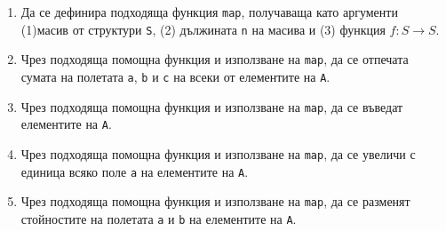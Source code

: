 \documentclass[12pt,a4paper]{article}
\begin{document}
\begin{enumerate}
\begin{enumerate}
	\item Да се дефинира подходяща функция \texttt{map}, получаваща като аргументи (1)масив от структури \texttt{S}, (2) дължината \texttt{n} на масива и (3) функция $f:S \rightarrow S$. 
	\item Чрез подходяща помощна функция и използване на \texttt{map}, да се отпечата сумата на полетата \texttt{a}, \texttt{b} и \texttt{c} на всеки от елементите на \texttt{A}.
	\item Чрез подходяща помощна функция и използване на \texttt{map}, да се въведат елементите на \texttt{A}.
	\item Чрез подходяща помощна функция и използване на \texttt{map}, да се увеличи с единица всяко поле \texttt{a} на елементите на \texttt{A}.
	\item Чрез подходяща помощна функция и използване на \texttt{map}, да се разменят стойностите на полетата \texttt{a} и \texttt{b} на елементите на \texttt{A}.

	

\end{enumerate}

\end{enumerate}


	\vspace{20px}
\end{document}
